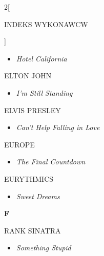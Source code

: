 \documentclass[a4paper]{report}
\begin{document}
\begin{multicols*}{2}[\begin{Huge}INDEKS WYKONAWCW\end{Huge}\vspace{1cm}]
\begin{minipage}{\columnwidth}
\begin{itemize}[topsep=3pt, after=\vspace{3mm}]
		\itemsep0em
		\item[]\textit{Hotel California}  \\
	\end{itemize}
\end{minipage}
\begin{minipage}{\columnwidth}
	ELTON JOHN 
	\begin{itemize}[topsep=3pt, after=\vspace{3mm}]
		\itemsep0em
		\item[]\textit{I'm Still Standing}  \\
	\end{itemize}
\end{minipage}
\begin{minipage}{\columnwidth}
	ELVIS PRESLEY 
	\begin{itemize}[topsep=3pt, after=\vspace{3mm}]
		\itemsep0em
		\item[]\textit{Can't Help Falling in Love}  \\
	\end{itemize}
\end{minipage}
\begin{minipage}{\columnwidth}
	EUROPE 
	\begin{itemize}[topsep=3pt, after=\vspace{3mm}]
		\itemsep0em
		\item[]\textit{The Final Countdown}  \\
	\end{itemize}
\end{minipage}
\begin{minipage}{\columnwidth}
	EURYTHMICS 
	\begin{itemize}[topsep=3pt, after=\vspace{3mm}]
		\itemsep0em
		\item[]\textit{Sweet Dreams}  \\
	\end{itemize}
\end{minipage}
\begin{minipage}{\columnwidth}
	\begin{Large}\textbf{F}\end{Large}RANK SINATRA 
	\begin{itemize}[topsep=3pt, after=\vspace{3mm}]
		\itemsep0em
		\item[]\textit{Something Stupid}  \\

\end{itemize}
\end{minipage}
\end{multicols*}
\end{document}
